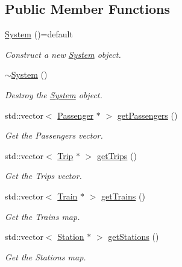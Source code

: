 \subsection*{Public Member Functions}
\begin{DoxyCompactItemize}
\item 
\mbox{\hyperlink{classSystem_a7ffb94a5a2db03014de0a8440f0cee3a}{System}} ()=default
\begin{DoxyCompactList}\small\item\em Construct a new \mbox{\hyperlink{classSystem}{System}} object. \end{DoxyCompactList}\item 
\mbox{\hyperlink{classSystem_a3be70bb338e3f062f821173fd15680d0}{$\sim$\+System}} ()
\begin{DoxyCompactList}\small\item\em Destroy the \mbox{\hyperlink{classSystem}{System}} object. \end{DoxyCompactList}\item 
std\+::vector$<$ \mbox{\hyperlink{classPassenger}{Passenger}} $\ast$ $>$ \mbox{\hyperlink{classSystem_a068044900b7db2474b6b97c9bed602e5}{get\+Passengers}} ()
\begin{DoxyCompactList}\small\item\em Get the Passengers vector. \end{DoxyCompactList}\item 
std\+::vector$<$ \mbox{\hyperlink{classTrip}{Trip}} $\ast$ $>$ \mbox{\hyperlink{classSystem_a2abffc916635c5c8fba9c35e076ddb99}{get\+Trips}} ()
\begin{DoxyCompactList}\small\item\em Get the Trips vector. \end{DoxyCompactList}\item 
std\+::vector$<$ \mbox{\hyperlink{classTrain}{Train}} $\ast$ $>$ \mbox{\hyperlink{classSystem_a5b75b51e691ed66fd8a8f53836fece76}{get\+Trains}} ()
\begin{DoxyCompactList}\small\item\em Get the Trains map. \end{DoxyCompactList}\item 
std\+::vector$<$ \mbox{\hyperlink{classStation}{Station}} $\ast$ $>$ \mbox{\hyperlink{classSystem_a9d46ff7bc1c5a1762a48d475bb796d38}{get\+Stations}} ()
\begin{DoxyCompactList}\small\item\em Get the Stations map. \end{DoxyCompactList}\item 

\end{DoxyCompactItemize}
